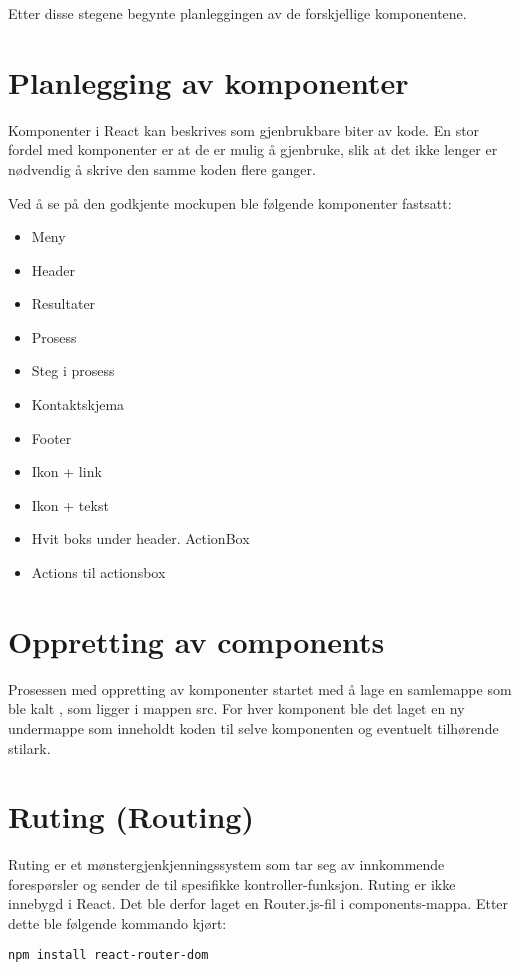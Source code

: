 Etter disse stegene begynte planleggingen av de forskjellige komponentene.

\section{Planlegging av komponenter}
Komponenter i React kan beskrives som gjenbrukbare biter av kode. En stor fordel med komponenter er at de er mulig å gjenbruke, slik at det ikke lenger er nødvendig å skrive den samme koden flere ganger. 

Ved å se på den godkjente mockupen ble følgende komponenter fastsatt: 
\begin{itemize}
\item Meny
\item Header
\item Resultater
\item Prosess
\item Steg i prosess
\item Kontaktskjema
\item Footer
\item Ikon + link
\item Ikon + tekst
\item Hvit boks under header. ActionBox
\item Actions til actionsbox
\end{itemize}

\section{Oppretting av components}
Prosessen med oppretting av komponenter startet med å lage en samlemappe som ble kalt , som ligger i mappen src. For hver komponent ble det laget en ny undermappe som inneholdt koden til selve komponenten og eventuelt tilhørende stilark.

\section{Ruting (Routing)}
Ruting er et mønstergjenkjenningssystem som tar seg av innkommende forespørsler og sender de til spesifikke kontroller-funksjon. Ruting er ikke innebygd i React. Det ble derfor laget en Router.js-fil i components-mappa. Etter dette ble følgende kommando kjørt:

\begin{lstlisting}[caption={Installering av React ruting},language=bash]
npm install react-router-dom
\end{lstlisting}

